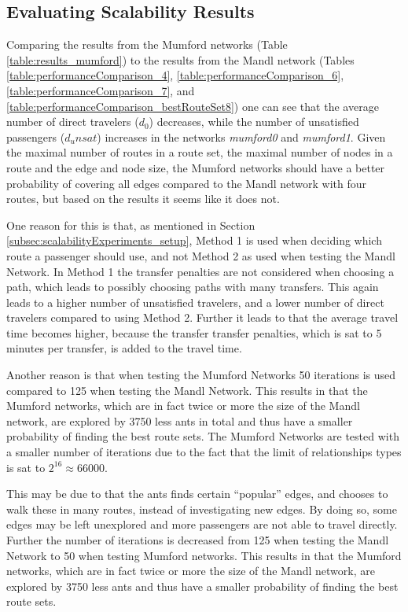 \subsection{Evaluating Scalability Results}

Comparing the results from the Mumford networks (Table \vref{table:results_mumford}) to the results from the Mandl network (Tables \vref{table:performanceComparison_4}, \vref{table:performanceComparison_6}, \vref{table:performanceComparison_7}, and \vref{table:performanceComparison_bestRouteSet8}) one can see that the average number of direct travelers ($d_0$) decreases, while the number of unsatisfied passengers ($d_unsat$) increases in the networks \textit{mumford0} and \textit{mumford1}. Given the maximal number of routes in a route set, the maximal number of nodes in a route and the edge and node size, the Mumford networks should have a better probability of covering all edges compared to the Mandl network with four routes, but based on the results it seems like it does not. 

One reason for this is that, as mentioned in Section \vref{subsec:scalabilityExperiments_setup}, Method 1 is used when deciding which route a passenger should use, and not Method 2 as used when testing the Mandl Network. In Method 1 the transfer penalties are not considered when choosing a path, which leads to possibly choosing paths with many transfers. This again leads to a higher number of unsatisfied travelers, and a lower number of direct travelers compared to using Method 2. Further it leads to that the average travel time becomes higher, because the transfer transfer penalties, which is sat to 5 minutes per transfer, is added to the travel time. 

Another reason is that when testing the Mumford Networks 50 iterations is used compared to 125 when testing the Mandl Network. This results in that the Mumford networks, which are in fact twice or more the size of the Mandl network, are explored by 3750 less ants in total and thus have a smaller probability of finding the best route sets. The Mumford Networks are tested with a smaller number of iterations due to the fact that the limit of relationships types is sat to $2^{16} \approx 66 000$. 


This may be due to that the ants finds certain ``popular'' edges, and chooses to walk these in many routes, instead of investigating new edges. By doing so, some edges may be left unexplored and more passengers are not able to travel directly. Further the number of iterations is decreased from 125 when testing the Mandl Network to 50 when testing Mumford networks. This results in that the Mumford networks, which are in fact twice or more the size of the Mandl network, are explored by 3750 less ants and thus have a smaller probability of finding the best route sets. 




